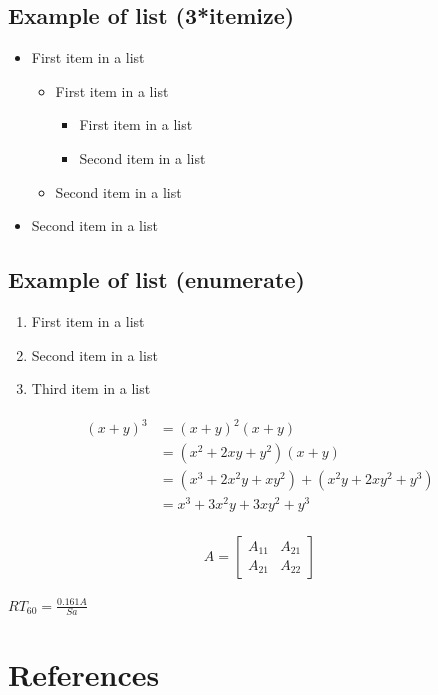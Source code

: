 \documentclass[paper=a4, fontsize=10pt, font=arial]{scrartcl} %
\numberwithin{equation}{section} %
\numberwithin{figure}{section} %
\numberwithin{table}{section} %
\begin{document}
\subsection{Example of list (3*itemize)}
\begin{itemize}
	\item First item in a list 
		\begin{itemize}
		\item First item in a list 
			\begin{itemize}
			\item First item in a list 
			\item Second item in a list 
			\end{itemize}
		\item Second item in a list 
		\end{itemize}
	\item Second item in a list 
\end{itemize}


\subsection{Example of list (enumerate)}
\begin{enumerate}
\item First item in a list 
\item Second item in a list 
\item Third item in a list
\end{enumerate}

\begin{align} 
\begin{split}
(x+y)^3 	&= (x+y)^2(x+y)\\
&=(x^2+2xy+y^2)(x+y)\\
&=(x^3+2x^2y+xy^2) + (x^2y+2xy^2+y^3)\\
&=x^3+3x^2y+3xy^2+y^3
\end{split}					
\end{align}

\begin{align}
A = 
\begin{bmatrix}
A_{11} & A_{21} \\
A_{21} & A_{22}
\end{bmatrix}
\end{align}

\begin{center}
$RT_{60} = \frac{0.161 A}{Sa}$\\
\end{center}


\newpage
\section{References}

{}

\end{document}
